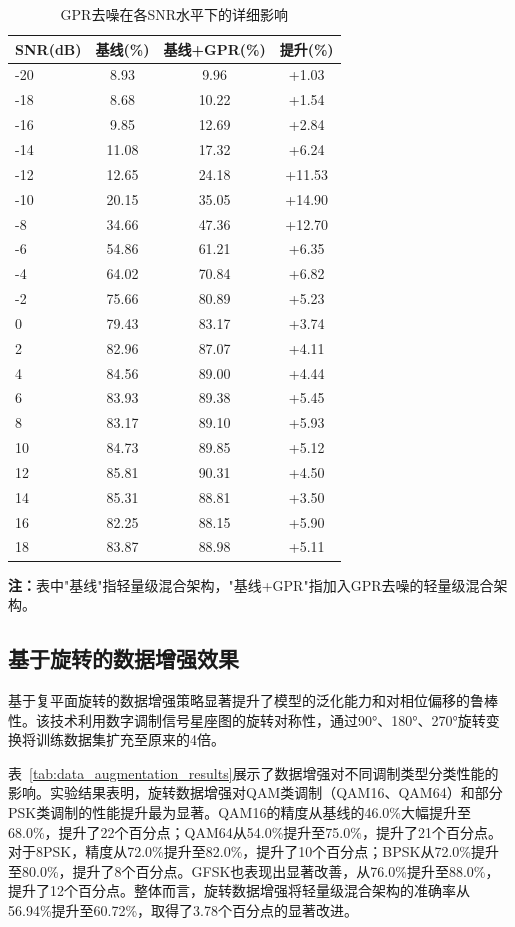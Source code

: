 \documentclass[conference]{IEEEtran}
\begin{document}
\begin{table}[h]
\centering
\caption{GPR去噪在各SNR水平下的详细影响}
\label{tab:gpr_detailed_snr}
\begin{tabular}{@{}lccc@{}}
\toprule
SNR(dB) & 基线(\%) & 基线+GPR(\%) & 提升(\%) \\
\midrule
-20 & 8.93 & 9.96 & +1.03 \\
-18 & 8.68 & 10.22 & +1.54 \\
-16 & 9.85 & 12.69 & +2.84 \\
-14 & 11.08 & 17.32 & +6.24 \\
-12 & 12.65 & 24.18 & +11.53 \\
-10 & 20.15 & 35.05 & +14.90 \\
-8 & 34.66 & 47.36 & +12.70 \\
-6 & 54.86 & 61.21 & +6.35 \\
-4 & 64.02 & 70.84 & +6.82 \\
-2 & 75.66 & 80.89 & +5.23 \\
0 & 79.43 & 83.17 & +3.74 \\
2 & 82.96 & 87.07 & +4.11 \\
4 & 84.56 & 
89.00 & +4.44 \\
6 & 83.93 & 89.38 & +5.45 \\
8 & 83.17 & 89.10 & +5.93 \\
10 & 84.73 & 89.85 & +5.12 \\
12 & 85.81 & 90.31 & +4.50 \\
14 & 85.31 & 88.81 & +3.50 \\
16 & 82.25 & 88.15 & +5.90 \\
18 & 83.87 & 88.98 & +5.11 \\
\bottomrule
\end{tabular}
\end{table}

\textbf{注：}表中"基线"指轻量级混合架构，"基线+GPR"指加入GPR去噪的轻量级混合架构。

\subsection{基于旋转的数据增强效果}

基于复平面旋转的数据增强策略显著提升了模型的泛化能力和对相位偏移的鲁棒性。该技术利用数字调制信号星座图的旋转对称性，通过90°、180°、270°旋转变换将训练数据集扩充至原来的4倍。

表~\ref{tab:data_augmentation_results}展示了数据增强对不同调制类型分类性能的影响。实验结果表明，旋转数据增强对QAM类调制（QAM16、QAM64）和部分PSK类调制的性能提升最为显著。QAM16的精度从基线的46.0\%大幅提升至68.0\%，提升了22个百分点；QAM64从54.0\%提升至75.0\%，提升了21个百分点。对于8PSK，精度从72.0\%提升至82.0\%，提升了10个百分点；BPSK从72.0\%提升至80.0\%，提升了8个百分点。GFSK也表现出显著改善，从76.0\%提升至88.0\%，提升了12个百分点。整体而言，旋转数据增强将轻量级混合架构的准确率从56.94\%提升至60.72\%，取得了3.78个百分点的显著改进。
\end{document}
